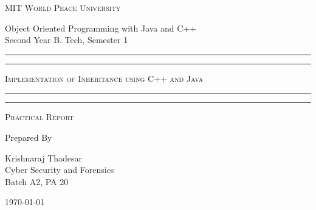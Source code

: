 \documentclass[11pt]{article}
\begin{document}
\begin{titlepage}
	\centering


	\huge\textsc{
		MIT World Peace University
	}\\

	\vspace{0.75\baselineskip} %

	\LARGE{
		Object Oriented Programming with Java and C++\\
		Second Year B. Tech, Semester 1
	}

	\vfill %


	\rule{\textwidth}{1.6pt}\vspace*{-\baselineskip}\vspace*{2pt}
	\rule{\textwidth}{0.6pt}
	\vspace{0.75\baselineskip} %



	\huge{\textsc{
			Implementation of Inheritance using C++ and Java
		}} \\



	\vspace{0.5\baselineskip} %
	\rule{\textwidth}{0.6pt}\vspace*{-\baselineskip}\vspace*{2.8pt}
	\rule{\textwidth}{1.6pt}

	\vspace{1\baselineskip} %


	\LARGE\textsc{
		Practical Report
	} %
	\vfill


	Prepared By
	\vspace{0.5\baselineskip} %

	\Large{
		Krishnaraj Thadesar \\
		Cyber Security and Forensics\\
		Batch A2, PA 20
	}


	\vspace{0.5\baselineskip} %
	\today

\end{titlepage}
\end{document}
